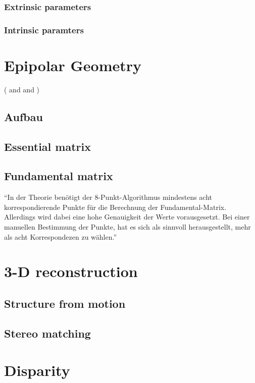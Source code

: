 \subsubsection{Extrinsic parameters}
\subsubsection{Intrinsic paramters}

\section{Epipolar Geometry}
(\cite{Hartley.2011} and \cite{Szeliski.2011} and \cite{Luhmann.2014})
\subsection{Aufbau}
\subsection{Essential matrix}
\subsection{Fundamental matrix}
\enquote{In der Theorie benötigt der 8-Punkt-Algorithmus mindestens acht korrespondierende Punkte für die Berechnung der Fundamental-Matrix. Allerdings wird dabei eine hohe Genauigkeit der Werte vorausgesetzt. Bei einer manuellen Bestimmung der Punkte, hat es sich als sinnvoll herausgestellt, mehr als acht Korrespondezen zu wählen.}


\section{3-D reconstruction}

\subsection{Structure from motion}\label{ssec:SfM}
\subsection{Stereo matching}\label{ssec:stereoMatch}
 
\section{Disparity}

